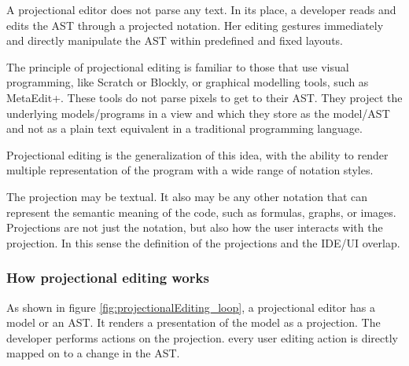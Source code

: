 A projectional editor does not parse any text.
In its place, a developer reads and edits the AST through a projected notation.
Her editing gestures immediately and directly manipulate the AST within predefined and fixed layouts.

The principle of projectional editing is familiar to those that use visual programming, like Scratch or Blockly, or graphical modelling tools, such as MetaEdit+.
These tools do not parse pixels to get to their AST. 
They project the underlying models/programs in a view and which they store as the model/AST and not as a plain text equivalent in a traditional programming language.

Projectional editing is the generalization of this idea, with the ability to render multiple representation of the program with a wide range of notation styles.

The projection may be textual. 
It also may be any other notation that can represent the semantic meaning of the code, such as formulas, graphs, or images.
Projections are not just the notation, but also how the user interacts with the projection.
In this sense the definition of the projections and the IDE/UI overlap.

\subsubsection{How projectional editing works}

As shown in figure \ref{fig:projectionalEditing_loop}, a projectional editor has a model or an AST. 
It renders a presentation of the model as a projection. 
The developer performs actions on the projection.
every user editing action is directly mapped on to a change in the AST. 

